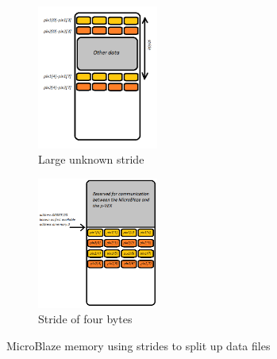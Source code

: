 \begin{figure}[htb]
	\centering
	\begin{subfigure}{0.3\textwidth}
		\centering
		\includegraphics[width=150px]{Pictures/stride}
		\caption{Large unknown stride}
		\label{fig:stride}
	\end{subfigure}
	\quad
	\begin{subfigure}{0.3\textwidth}
		\centering
		\includegraphics[width=150px]{Pictures/pixels_dmem}
		\caption{Stride of four bytes}
		\label{fig:testpixels}
	\end{subfigure}
\caption{MicroBlaze memory using strides to split up data files}%
\label{}%
\end{figure}
